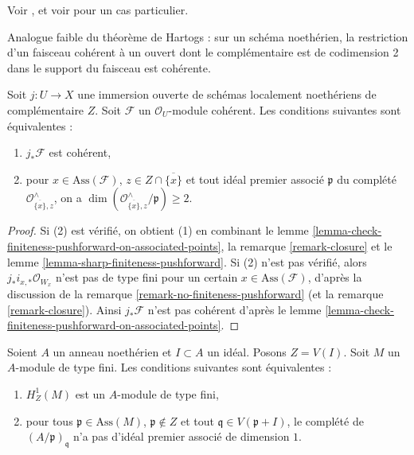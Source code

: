 \begin{proposition}[Koll\'ar]
\label{proposition-kollar}
\begin{reference}
Voir \cite{k-coherent}, et voir \cite[IV, Proposition 7.2.2]{EGA} pour un cas particulier.
\end{reference}
\begin{slogan}
Analogue faible du théorème de Hartogs : sur un schéma noethérien, la restriction d'un faisceau cohérent à un ouvert dont le complémentaire est de codimension 2 dans le support du faisceau est cohérente.
\end{slogan}
Soit $j : U \to X$ une immersion ouverte de schémas localement noethériens de complémentaire $Z$. Soit $\mathcal{F}$ un $\mathcal{O}_U$-module cohérent. Les conditions suivantes sont équivalentes :
\begin{enumerate}
\item $j_*\mathcal{F}$ est cohérent,
\item pour $x \in \text{Ass}(\mathcal{F})$, $z \in Z \cap \overline{\{x\}}$ et tout idéal premier associé $\mathfrak p$ du complété $\mathcal{O}_{\overline{\{x\}}, z}^\wedge$, on a $\dim(\mathcal{O}_{\overline{\{x\}}, z}^\wedge/\mathfrak p) \geq 2$.
\end{enumerate}
\end{proposition}

\begin{proof}
Si (2) est vérifié, on obtient (1) en combinant le lemme \ref{lemma-check-finiteness-pushforward-on-associated-points}, la remarque \ref{remark-closure} et le lemme \ref{lemma-sharp-finiteness-pushforward}. Si (2) n'est pas vérifié, alors $j_*i_{x, *}\mathcal{O}_{W_x}$ n'est pas de type fini pour un certain $x \in \text{Ass}(\mathcal{F})$, d'après la discussion de la remarque \ref{remark-no-finiteness-pushforward} (et la remarque \ref{remark-closure}). Ainsi $j_*\mathcal{F}$ n'est pas cohérent d'après le lemme \ref{lemma-check-finiteness-pushforward-on-associated-points}.
\end{proof}

\begin{lemma}
\label{lemma-kollar-finiteness-H1-local}
Soient $A$ un anneau noethérien et $I \subset A$ un idéal. Posons $Z = V(I)$. Soit $M$ un $A$-module de type fini. Les conditions suivantes sont équivalentes :
\begin{enumerate}
\item $H^1_Z(M)$ est un $A$-module de type fini,
\item pour tous $\mathfrak p \in \text{Ass}(M)$, $\mathfrak p \not \in Z$ et tout $\mathfrak q \in V(\mathfrak p + I)$, le complété de $(A/\mathfrak p)_\mathfrak q$ n'a pas d'idéal premier associé de dimension $1$.
\end{enumerate}
\end{lemma}

